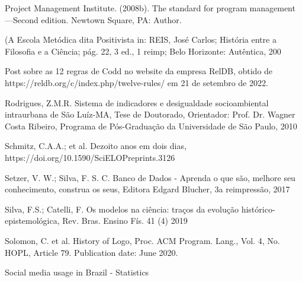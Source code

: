 \begin{flushleft}
[PMI, 2008] Project Management Institute. (2008b). The standard for program management—Second edition. Newtown Square, PA: Author.
\end{flushleft}


\begin{flushleft}
[REIS , 2006] (A Escola Metódica dita Positivista in: REIS, José Carlos; História entre a Filosofia e a Ciência; pág. 22, 3 ed., 1 reimp; Belo Horizonte: Autêntica, 200
\end{flushleft}


\begin{flushleft}
[RelDB, 2019] Post sobre as 12 regras de Codd no website da empresa RelDB, obtido de https://reldb.org/c/index.php/twelve-rules/ em 21 de setembro de 2022.
\end{flushleft}


\begin{flushleft}
[RODRIGUES, 2010] Rodrigues, Z.M.R. Sistema de indicadores e desigualdade socioambiental intraurbana de São Luíz-MA, Tese de Doutorado, Orientador: Prof. Dr. Wagner Costa Ribeiro, Programa de Pós-Graduação da Universidade de São Paulo, 2010
\end{flushleft}


\begin{flushleft}
[SCHMITZ et al., 2021] Schmitz, C.A.A.; et al. Dezoito anos em dois dias, https://doi.org/10.1590/SciELOPreprints.3126
\end{flushleft}


\begin{flushleft}
 Setzer, V. W.; Silva, F. S. C. Banco de Dados - Aprenda o que são, melhore seu conhecimento, construa os seus, Editora Edgard Blucher, 3a reimpressão, 2017
\end{flushleft}


\begin{flushleft}
 Silva, F.S.; Catelli, F. Os modelos na ciência: traços da evolução histórico-epistemológica,  Rev. Bras. Ensino Fís. 41 (4) 2019
\end{flushleft}


\begin{flushleft}
[SOLOMON et al., 2020] Solomon, C. et al. History of Logo, Proc. ACM Program. Lang., Vol. 4, No. HOPL, Article 79. Publication date: June 2020.
\end{flushleft}


\begin{flushleft}
[STATISTA, 2022] Social media usage in Brazil - Statistics
\end{flushleft}


